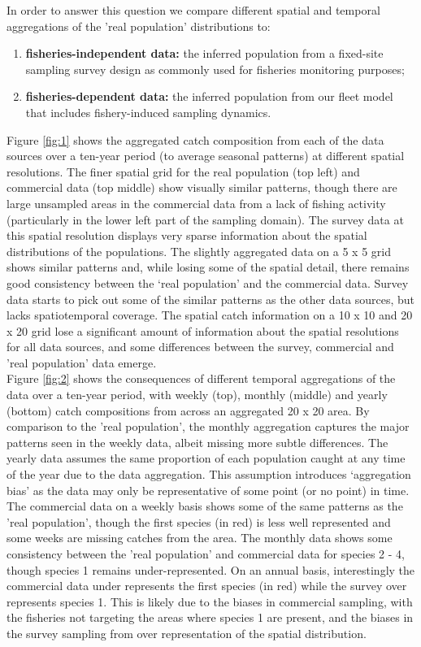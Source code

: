 \documentclass[review]{elsarticle}
\begin{document}
In order to answer this question we compare different spatial and temporal
aggregations of the 'real population' distributions to:
\begin{enumerate}[label=\alph*)]
	\item \textbf{fisheries-independent data:} the inferred population from
		a fixed-site sampling survey design as commonly used for
		fisheries monitoring purposes;
	\item \textbf{fisheries-dependent data:} the inferred population from
		our fleet model that includes fishery-induced sampling
		dynamics.
\end{enumerate}

Figure \ref{fig:1} shows the aggregated catch composition from each of the data
sources over a ten-year period (to average seasonal patterns) at different
spatial resolutions. The finer spatial grid for the real population (top left)
and commercial data (top middle) show visually similar patterns, though there
are large unsampled areas in the commercial data from a lack of fishing
activity (particularly in the lower left part of the sampling domain). The
survey data at this spatial resolution displays very sparse information about
the spatial distributions of the populations. The slightly aggregated data on a
5 x 5 grid shows similar patterns and, while losing some of the spatial detail,
there remains good consistency between the `real population' and the commercial
data. Survey data starts to pick out some of the similar patterns as the other
data sources, but lacks spatiotemporal coverage. The spatial catch information
on a 10 x 10 and 20 x 20 grid lose a significant amount of information about
the spatial resolutions for all data sources, and some differences between the
survey, commercial and 'real population' data emerge. \\

Figure \ref{fig:2} shows the consequences of different temporal aggregations of
the data over a ten-year period, with weekly (top), monthly (middle) and yearly
(bottom) catch compositions from across an aggregated 20 x 20 area. By
comparison to the 'real population', the monthly aggregation captures the major
patterns seen in the weekly data, albeit missing more subtle differences. The
yearly data assumes the same proportion of each population caught at any time
of the year due to the data aggregation. This assumption introduces
`aggregation bias' as the data may only be representative of some point (or no
point) in time. The commercial data on a weekly basis shows some of the same
patterns as the 'real population', though the first species (in red) is less
well represented and some weeks are missing catches from the area. The monthly
data shows some consistency between the 'real population' and commercial data
for species 2 - 4, though species 1 remains under-represented. On an annual
basis, interestingly the commercial data under represents the first species (in
red) while the survey over represents species
1. This is likely due to the biases in commercial sampling, with the fisheries
not targeting the areas where species 1 are present, and the biases in the
survey sampling from over representation of
the spatial distribution. 
\end{document}
